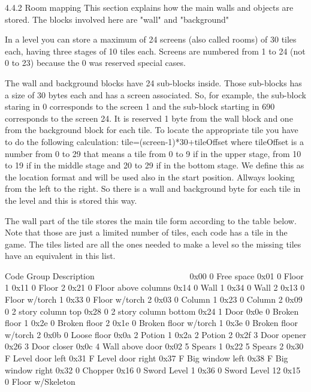 4.4.2 Room mapping
 This section explains how the main walls and objects are stored. The
 blocks involved here are "wall" and "background"

 In a level you can store a maximum of 24 screens (also called rooms) of 30
 tiles each, having three stages of 10 tiles each. Screens are numbered
 from 1 to 24 (not 0 to 23) because the 0 was reserved special cases.

 The wall and background blocks have 24 sub-blocks inside. Those sub-blocks
 has a size of 30 bytes each and has a screen associated. So, for example,
 the sub-block staring in 0 corresponds to the screen 1 and the sub-block
 starting in 690 corresponds to the screen 24. 
 It is reserved 1 byte from the wall block and one from the background
 block for each tile. To locate the appropriate tile you have to do the
 following calculation: tile=(screen-1)*30+tileOffset where tileOffset is a
 number
 from 0 to 29 that means a tile from 0 to 9 if in the upper stage, from
 10 to 19 if in the middle stage and 20 to 29 if in the bottom stage.
 We define this as the location format and will be used also in the start
 position.
 Allways looking from the left to the right.
 So there is a wall and background byte for each tile in the level and this
 is stored this way.

 The wall part of the tile stores the main tile form according to the table
 below. Note that those are just a limited number of tiles, each code has a
 tile in the game. The tiles listed are all the ones needed to make a level
 so the missing tiles have an equivalent in this list.

  Code Group Description
  ~~~~ ~~~~~ ~~~~~~~~~~~
  0x00 0     Free space
  0x01 0     Floor 1
  0x11 0     Floor 2
  0x21 0     Floor above columns
  0x14 0     Wall 1
  0x34 0     Wall 2
  0x13 0     Floor w/torch 1  
  0x33 0     Floor w/torch 2     
  0x03 0     Column 1   
  0x23 0     Column 2   
  0x09 0     2 story column top
  0x28 0     2 story column bottom
  0x24 1     Door
  0x0e 0     Broken floor 1
  0x2e 0     Broken floor 2
  0x1e 0     Broken floor w/torch 1
  0x3e 0     Broken floor w/torch 2
  0x0b 0     Loose floor
  0x0a 2     Potion 1
  0x2a 2     Potion 2    
  0x2f 3     Door opener
  0x26 3     Door closer
  0x0c 4     Wall above door
  0x02 5     Spears 1
  0x22 5     Spears 2
  0x30 F     Level door left
  0x31 F     Level door right
  0x37 F     Big window left
  0x38 F     Big window right
  0x32 0     Chopper
  0x16 0     Sword Level 1
  0x36 0     Sword Level 12
  0x15 0     Floor w/Skeleton
  
